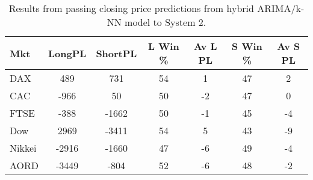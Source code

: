 \begin{table}[ht]
\centering
\caption[Results from passing closing price predictions from hybrid ARIMA/k-NN model to System 2]{Results from passing closing price predictions from hybrid ARIMA/k-NN model to System 2.} 
\label{tab:chp_ts:pred_close_arima_knn_sys2}
\begin{tabular}{lcccccc}
  \toprule Mkt & LongPL & ShortPL & L Win \% & Av L PL & S Win \% & Av S PL \\ 
  \midrule DAX & 489 & 731 & 54 & 1 & 47 & 2 \\ 
  CAC & -966 & 50 & 50 & -2 & 47 & 0 \\ 
  FTSE & -388 & -1662 & 50 & -1 & 45 & -4 \\ 
  Dow & 2969 & -3411 & 54 & 5 & 43 & -9 \\ 
  Nikkei & -2916 & -1660 & 47 & -6 & 49 & -4 \\ 
  AORD & -3449 & -804 & 52 & -6 & 48 & -2 \\ 
   \bottomrule \end{tabular}
\end{table}
